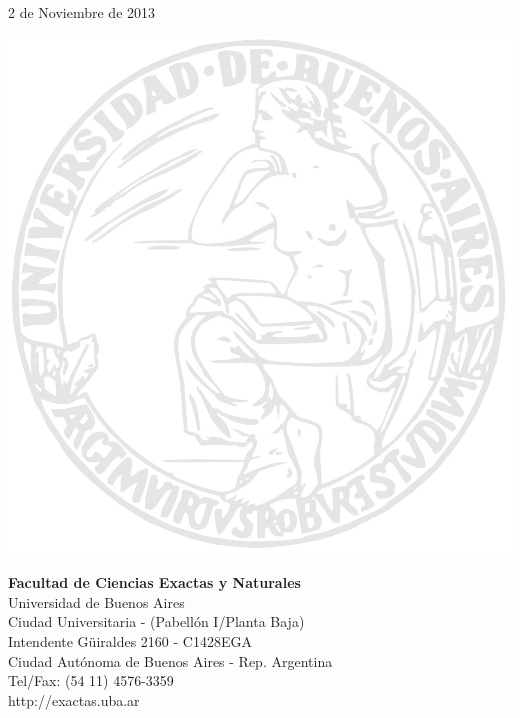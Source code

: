 \documentclass[]{article}
\begin{document}
\begin{titlepage}

{\large 2 de Noviembre de 2013}\\[2cm] %


\begin{minipage}[t]{\textwidth}
    \begin{minipage}[t]{.55 \textwidth}
        \includegraphics{logo_uba.jpg}
    \end{minipage}%
    \begin{minipage}[b]{.45 \textwidth}
        \textbf{\textsf{Facultad de Ciencias Exactas y Naturales}} \\
        \textsf{Universidad de Buenos Aires} \\
        {\scriptsize %
        Ciudad Universitaria - (Pabell\'on I/Planta Baja) \\
            Intendente G\"uiraldes 2160 - C1428EGA \\
        Ciudad Aut\'onoma de Buenos Aires - Rep. Argentina \\
            Tel/Fax: (54 11) 4576-3359 \\
        http://exactas.uba.ar \\
        }
    \end{minipage}
\end{minipage}%


\end{titlepage}
\end{document}
